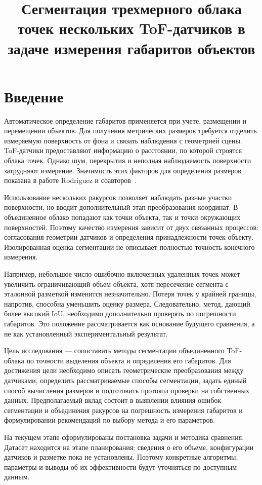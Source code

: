 \documentclass{misisarticle}
\title{Сегментация трехмерного облака точек нескольких ToF-датчиков в задаче измерения габаритов объектов}
\begin{document}
\maketitle

\section{Введение}

Автоматическое определение габаритов применяется при учете, размещении и перемещении объектов. Для получения метрических размеров требуется отделить измеряемую поверхность от фона и связать наблюдения с геометрией сцены. ToF-датчики предоставляют информацию о расстоянии, по которой строятся облака точек. Однако шум, перекрытия и неполная наблюдаемость поверхности затрудняют измерение. Значимость этих факторов для определения размеров показана в работе Rodriguez и соавторов~\cite{rodriguez2023}.

Использование нескольких ракурсов позволяет наблюдать разные участки поверхности, но вводит дополнительный этап преобразования координат. В объединенное облако попадают как точки объекта, так и точки окружающих поверхностей. Поэтому качество измерения зависит от двух связанных процессов: согласования геометрии датчиков и определения принадлежности точек объекту. Изолированная оценка сегментации не описывает полностью точность конечного измерения.

Например, небольшое число ошибочно включенных удаленных точек может увеличить ограничивающий объем объекта, хотя пересечение сегмента с эталонной разметкой изменится незначительно. Потеря точек у крайней границы, напротив, способна уменьшить оценку размера. Следовательно, метод, дающий более высокий IoU, необходимо дополнительно проверять по погрешности габаритов. Это положение рассматривается как основание будущего сравнения, а не как установленный экспериментальный результат.

Цель исследования --- сопоставить методы сегментации объединенного ToF-облака по точности выделения объекта и определения его габаритов. Для достижения цели необходимо описать геометрические преобразования между датчиками, определить рассматриваемые способы сегментации, задать единый способ вычисления размеров и подготовить протокол проверки на собственных данных. Предполагаемый вклад состоит в выявлении влияния ошибок сегментации и объединения ракурсов на погрешность измерения габаритов и формулировании рекомендаций по выбору метода и его параметров.

На текущем этапе сформулированы постановка задачи и методика сравнения. Датасет находится на этапе планирования; сведения о его объеме, конфигурации датчиков и разметке пока не установлены. Поэтому конкретные алгоритмы, параметры и выводы об их эффективности будут уточняться по доступным данным.
\end{document}
